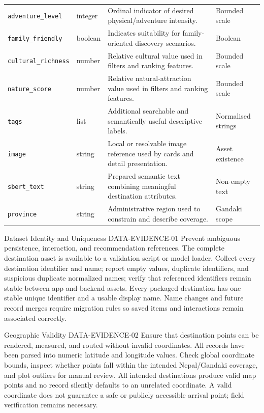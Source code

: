\begin{longtable}{p{3.2cm}p{2.2cm}p{6.1cm}p{2.5cm}}
\texttt{adventure\_\allowbreak level} & integer & Ordinal indicator of desired physical/adventure intensity. & Bounded scale \\
\texttt{family\_\allowbreak friendly} & boolean & Indicates suitability for family-oriented discovery scenarios. & Boolean \\
\texttt{cultural\_\allowbreak richness} & number & Relative cultural value used in filters and ranking features. & Bounded scale \\
\texttt{nature\_score} & number & Relative natural-attraction value used in filters and ranking features. & Bounded scale \\
\texttt{tags} & list & Additional searchable and semantically useful descriptive labels. & Normalised strings \\
\texttt{image} & string & Local or resolvable image reference used by cards and detail presentation. & Asset existence \\
\texttt{sbert\_text} & string & Prepared semantic text combining meaningful destination attributes. & Non-empty text \\
\texttt{province} & string & Administrative region used to constrain and describe coverage. & Gandaki scope \\
\bottomrule
\end{longtable}

\EvidenceSheet
{Dataset Identity and Uniqueness}
{DATA-EVIDENCE-01}
{Prevent ambiguous persistence, interaction, and recommendation references.}
{The complete destination asset is available to a validation script or model loader.}
{Collect every destination identifier and name; report empty values, duplicate identifiers, and suspicious duplicate normalized names; verify that referenced identifiers remain stable between app and backend assets.}
{Every packaged destination has one stable unique identifier and a usable display name.}
{Name changes and future record merges require migration rules so saved items and interactions remain associated correctly.}

\EvidenceSheet
{Geographic Validity}
{DATA-EVIDENCE-02}
{Ensure that destination points can be rendered, measured, and routed without invalid coordinates.}
{All records have been parsed into numeric latitude and longitude values.}
{Check global coordinate bounds, inspect whether points fall within the intended Nepal/Gandaki coverage, and plot outliers for manual review.}
{All intended destinations produce valid map points and no record silently defaults to an unrelated coordinate.}
{A valid coordinate does not guarantee a safe or publicly accessible arrival point; field verification remains necessary.}

